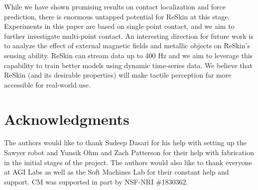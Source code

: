\documentclass{article}
\begin{document}
 While we have shown promising results on contact localization and force prediction, there is enormous untapped potential for ReSkin at this stage. Experiments in this paper are based on single point contact, and we aim to further investigate multi-point contact. An interesting direction for future work is to analyze the effect of external magnetic fields and metallic objects on ReSkin's sensing ability. ReSkin can stream data up to 400 Hz and we aim to leverage this capability to train better models using dynamic time-series data. We believe that ReSkin (and its desirable properties) will make tactile perception far more accessible for real-world use.

\section*{Acknowledgments}
The authors would like to thank Sudeep Dasari for his help with setting up the Sawyer robot and Yunsik Ohm and Zach Patterson for their help with fabrication in the initial stages of the project. The authors would also like to thank everyone at AGI Labs as well as the Soft Machines Lab for their constant help and support. CM was supported in part by NSF-NRI \#1830362. 

\end{document}
